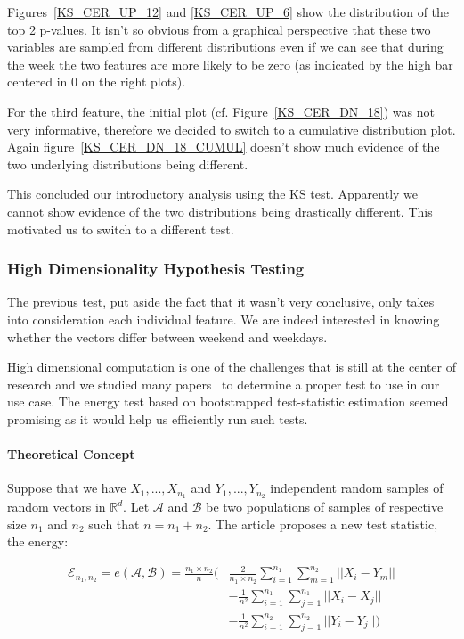 Figures~\ref{KS_CER_UP_12} and \ref{KS_CER_UP_6} show the distribution of the top 2 p-values. It isn't so obvious from a graphical perspective that these two variables are sampled from different distributions even if we can see that during the week the two features are more likely to be zero (as indicated by the high bar centered in 0 on the right plots). 

For the third feature, the initial plot (cf. Figure~\ref{KS_CER_DN_18}) was not very informative, therefore we decided to switch to a cumulative distribution plot. Again figure~\ref{KS_CER_DN_18_CUMUL} doesn't show much evidence of the two underlying distributions being different.

This concluded our introductory analysis using the KS test. Apparently we cannot show evidence of the two distributions being drastically different. This motivated us to switch to a different test. 

\subsubsection{High Dimensionality Hypothesis Testing}
The previous test, put aside the fact that it wasn't very conclusive, only takes into consideration each individual feature. We are indeed interested in knowing whether the vectors differ between weekend and weekdays. 

High dimensional computation is one of the challenges that is still at the center of research and we studied many papers~\cite{min_energy,two_sample_equality,dimensional_object,energy_test} to determine a proper test to use in our use case. The energy test based on bootstrapped test-statistic estimation seemed promising as it would help us efficiently run such tests.

\paragraph{Theoretical Concept}  
Suppose that we have $X_{1},...,X_{n_1}$ and $Y_{1},...,Y_{n_2}$ independent random samples of random vectors in $\mathbb{R}^d$. Let $\mathcal{A}$ and $\mathcal{B}$ be two populations of samples of respective size $n_1$ and $n_2$ such that $n=n_1+n_2$. The article proposes a new test statistic, the energy:

\begin{align}
	\mathcal{E}_{n_1,n_2} = e(\mathcal{A},\mathcal{B}) = \frac{n_1 \times n_2}{n} ( & \frac{2}{n_1\times n_2} \sum_{i=1}^{n_1}\sum_{m=1}^{n_2}||X_i-Y_m||\\ 
	&- \frac{1}{n^2}\sum_{i=1}^{n_1}\sum_{j=1}^{n_1}||X_i-X_j||\\ 
	&- \frac{1}{n^2}\sum_{i=1}^{n_2}\sum_{j=1}^{n_2}||Y_i-Y_j||)\\
\end{align}

